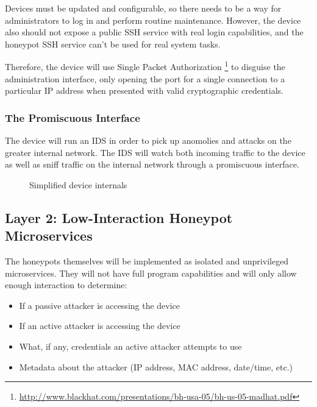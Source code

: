 Devices must be updated and configurable, so there needs to be a way for
administrators to log in and perform routine maintenance. However, the device
also should not expose a public SSH service with real login capabilities, and
the honeypot SSH service can't be used for real system tasks.

Therefore, the device will use Single Packet Authorization
\footnote{\url{http://www.blackhat.com/presentations/bh-usa-05/bh-us-05-madhat.pdf}}
to disguise the administration interface, only opening the port for a single
connection to a particular IP address when presented with valid cryptographic
credentials.
\subsubsection{The Promiscuous Interface}

The device will run an IDS in order to pick up anomolies and attacks on
the greater internal network. The IDS will watch both incoming traffic to
the device as well as sniff traffic on the internal network through a
promiscuous interface.

\begin{figure}
\centering
{

}
\caption{Simplified device internals}
\label{figure:device}
\end{figure}
 

\subsection{Layer 2: Low-Interaction Honeypot Microservices}

The honeypots themselves will be implemented as isolated and unprivileged
microservices. They will not have full program capabilities and will only
allow enough interaction to determine:

\begin{itemize}
    \item If a passive attacker is accessing the device
    \item If an active attacker is accessing the device
    \item What, if any, credentials an active attacker attempts to use
    \item Metadata about the attacker (IP address, MAC address, date/time, etc.)
\end{itemize}

